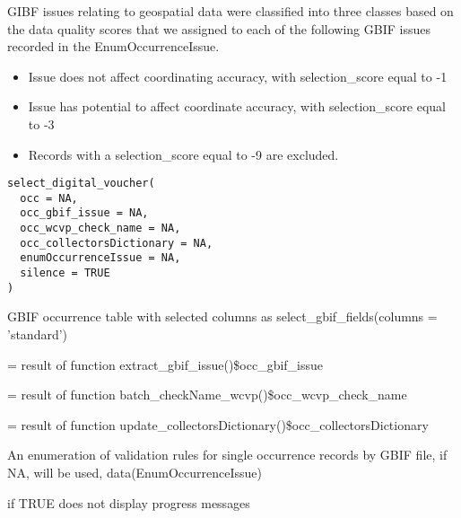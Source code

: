 \documentclass[a4paper]{book}
\begin{document}
\begin{Description}
\begin{itemize}
\end{itemize}


GIBF issues relating to geospatial data were classified into three classes based on the data quality
scores that we assigned to each of the following GBIF issues recorded in the EnumOccurrenceIssue.
\begin{itemize}

\item{} Issue does not affect coordinating accuracy, with selection\_score equal to -1
\item{} Issue has potential to affect coordinate accuracy, with selection\_score equal to -3
\item{} Records with a selection\_score equal to -9 are excluded.

\end{itemize}

\end{Description}
%
\begin{Usage}
\begin{verbatim}
select_digital_voucher(
  occ = NA,
  occ_gbif_issue = NA,
  occ_wcvp_check_name = NA,
  occ_collectorsDictionary = NA,
  enumOccurrenceIssue = NA,
  silence = TRUE
)
\end{verbatim}
\end{Usage}
%
\begin{Arguments}
\begin{ldescription}
\item[\code{occ}] GBIF occurrence table with selected columns as select\_gbif\_fields(columns = 'standard')

\item[\code{occ\_gbif\_issue}] = result of function extract\_gbif\_issue()\$occ\_gbif\_issue

\item[\code{occ\_wcvp\_check\_name}] = result of function batch\_checkName\_wcvp()\$occ\_wcvp\_check\_name

\item[\code{occ\_collectorsDictionary}] = result of function update\_collectorsDictionary()\$occ\_collectorsDictionary

\item[\code{enumOccurrenceIssue}] An enumeration of validation rules for single occurrence records by GBIF file, if NA, will be used, data(EnumOccurrenceIssue)

\item[\code{silence}] if TRUE does not display progress messages
\end{ldescription}
\end{Arguments}
\end{document}
